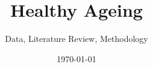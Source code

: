 \documentclass{master_thesis.style}		%
\begin{document}

\title{Healthy Ageing}
\addresses{\groupname\\\deptname\\\univname}
\date{\today}
\subject{Healthy Ageing}
\subtitle {Data, Literature Review, Methodology}
% 

\maketitle

%

\tableofcontents


%



%
%



%
%
%
%

\typeout{}




\end{document}
